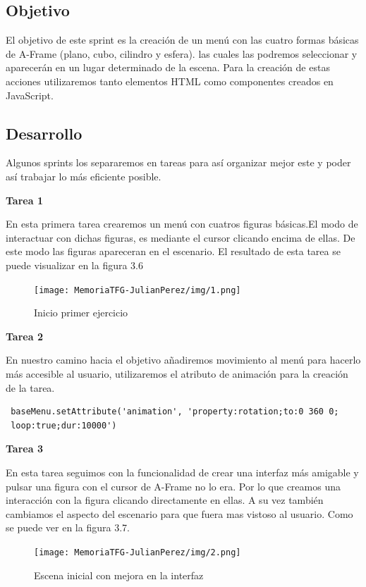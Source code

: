 \documentclass[a4paper, 12pt]{book}
\begin{document}
\subsection{Objetivo}
El objetivo de este sprint es la creación de un menú con las cuatro formas básicas de A-Frame (plano, cubo, cilindro y esfera). las cuales las podremos seleccionar y aparecerán en un lugar determinado de la escena. Para la creación de estas acciones utilizaremos tanto elementos HTML como componentes creados en JavaScript.

\subsection{Desarrollo}
Algunos sprints los separaremos en tareas para así organizar mejor este y poder así trabajar lo más eficiente posible.

\textbf{Tarea 1}

En esta primera tarea crearemos un menú con cuatros figuras básicas.El modo de interactuar con dichas figuras, es  mediante el cursor clicando encima de ellas. De este modo las figuras apareceran en el escenario.
El resultado de esta tarea se puede visualizar en la figura 3.6
\begin{figure}[H]
  \centering
  \texttt{[image: MemoriaTFG-JulianPerez/img/1.png]}
  \caption{Inicio primer ejercicio}\label{scrum}
\end{figure}

\textbf{Tarea 2}

En nuestro camino hacia el objetivo añadiremos movimiento al menú para hacerlo más accesible al usuario, utilizaremos el atributo  de animación para la creación de la tarea.
\begin{verbatim}
 baseMenu.setAttribute('animation', 'property:rotation;to:0 360 0;
 loop:true;dur:10000')   
\end{verbatim}

\textbf{Tarea 3}

En esta tarea seguimos con la funcionalidad de crear una interfaz más amigable y pulsar una figura con el cursor de A-Frame no lo era. Por lo que creamos una interacción con la figura clicando directamente en ellas. A su vez también cambiamos el aspecto del escenario para que fuera mas vistoso al usuario. Como se puede ver en la figura 3.7.
         \begin{figure}[H]
  \centering
  \texttt{[image: MemoriaTFG-JulianPerez/img/2.png]}
  \caption{Escena inicial con mejora en la interfaz}\label{scrum}
\end{figure}
\end{document}
